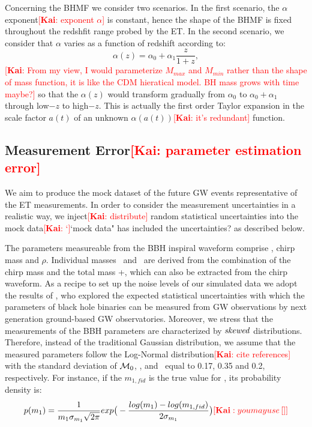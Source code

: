 \documentclass[twocolumn]{aastex62}
\newcommand{\kai}[1]{\textcolor{red}{[{\bf Kai}: #1]}}
\begin{document}
Concerning the BHMF we consider two scenarios. In the first scenario, the $\alpha$ exponent\kai{exponent $\alpha$} is constant, hence the shape of the BHMF is fixed throughout the redshfit range probed by the ET. In the second scenario, we consider that $\alpha$ varies as a function of redshift according to:
 \begin{equation} \label{equ_alphaz}
\alpha(z) = \alpha_0 + \alpha_1\frac{z}{1+z} , 
 \end{equation}
 \kai{From my view, I would parameterize $M_{max}$ and $M_{min}$ rather than the shape of mass function, it is like the CDM hieratical model.
 BH mass grows with time maybe?}
so that the $\alpha(z)$ would transform gradually from $\alpha_0$ to $\alpha_0+\alpha_1$ through low$-z$ to high$-z$. This is actually the first order Taylor expansion in the scale factor $a(t)$ of an unknown $\alpha(a(t))$\kai{it's redundant} function.



\subsection{Measurement Error\kai{parameter estimation error}} \label{sec_noiselevel}
We aim to produce the mock dataset of the future GW events representative of the ET  measurements. In order to consider the measurement uncertainties in a realistic way, we inject\kai{distribute} random statistical uncertainties into the mock data\kai``{mock data" has included the uncertainties?} as described below.

The parameters measureable from the BBH inspiral waveform comprise \dl, chirp mass and $\rho$. Individual masses \mone\ and \mtwo\ are derived from the combination of the chirp mass and the total mass \mone+\mtwo, which can also be extracted from the chirp waveform. As a recipe to set up the noise levels of our simulated data we adopt the results of \citet{Ghosh2016}, who  explored the expected statistical uncertainties with which the parameters of black hole binaries can be measured from GW observations by next generation ground-based GW observatories. 
Moreover, we stress that the measurements of the BBH parameters are characterized by ${\it skewed}$ distributions. Therefore, instead of the traditional Gaussian distribution, we assume that the measured parameters follow the Log-Normal distribution\kai{cite references} with the standard deviation of  ${\cal M}_0$, \dl, and \mone\ equal to 0.17, 0.35 and 0.2, respectively. For instance, if the $m_{1,fid}$ is the true value for \mone, its probability density is:
 \begin{equation} \label{equ_lognorm}
p(m_1) = \frac{1}{m_1 \sigma_{m_1} \sqrt{2\pi}} exp \big(- \frac{log(m_1)-log(m_{1,fid})}{2\sigma_{m_1}} \big) \kai{you may use \left[ \right]}
 \end{equation}
 
\end{document}
